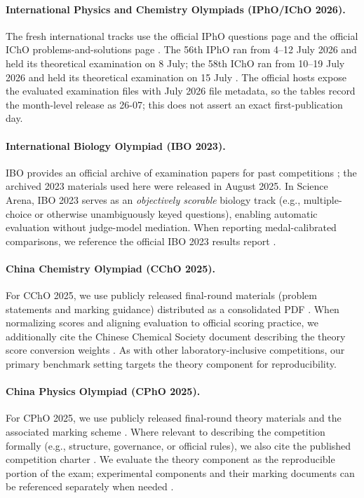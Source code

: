 \documentclass[11pt]{article}
\begin{document}
\paragraph{International Physics and Chemistry Olympiads (IPhO/IChO 2026).}
The fresh international tracks use the official IPhO questions page and the official IChO problems-and-solutions page \citep{ipho2026_official_questions,icho2026_official_problems}.
The 56th IPhO ran from 4--12 July 2026 and held its theoretical examination on 8 July; the 58th IChO ran from 10--19 July 2026 and held its theoretical examination on 15 July \citep{ipho2026_official_program,icho2026_official_program}. The official hosts expose the evaluated examination files with July 2026 file metadata, so the tables record the month-level release as 26-07; this does not assert an exact first-publication day.

\paragraph{International Biology Olympiad (IBO 2023).}
IBO provides an official archive of examination papers for past competitions \citep{ibo_papers_archive}; the archived 2023 materials used here were released in August 2025. In Science Arena, IBO 2023 serves as an \emph{objectively scorable} biology track (e.g., multiple-choice or otherwise unambiguously keyed questions), enabling automatic evaluation without judge-model mediation. When reporting medal-calibrated comparisons, we reference the official IBO 2023 results report \citep{ibo2023_final_results}.

\paragraph{China Chemistry Olympiad (CChO 2025).}
For CChO 2025, we use publicly released final-round materials (problem statements and marking guidance) distributed as a consolidated PDF \citep{ccho2025_final_theory_paper_public_pdf}. When normalizing scores and aligning evaluation to official scoring practice, we additionally cite the Chinese Chemical Society document describing the theory score conversion weights \citep{ccho2025_theory_weighting_chemsoc}. As with other laboratory-inclusive competitions, our primary benchmark setting targets the theory component for reproducibility.

\paragraph{China Physics Olympiad (CPhO 2025).}
For CPhO 2025, we use publicly released final-round theory materials and the associated marking scheme \citep{cpho2025_final_theory_paper_public_pdf,cpho2025_final_theory_solution_marking_public_pdf}. Where relevant to describing the competition formally (e.g., structure, governance, or official rules), we also cite the published competition charter \citep{cpho_charter_2025_revision}. We evaluate the theory component as the reproducible portion of the exam; experimental components and their marking documents can be referenced separately when needed \citep{cpho2025_final_practical_paper_public_pdf,cpho2025_final_practical_answer_key_public_pdf}.
\end{document}
